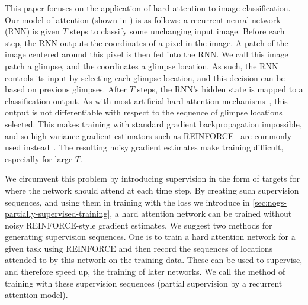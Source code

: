 This paper focuses on the application of hard attention to image classification.
Our model of attention (shown in ) is as
follows: a recurrent neural network (RNN) is given $T$ steps to classify some
unchanging input image. Before each step, the RNN outputs the coordinates of a
pixel in the image. A patch of the image centered around this pixel is then fed
into the RNN. We call this image patch a glimpse, and the coordinates a glimpse
location. As such, the RNN controls its input by selecting each glimpse
location, and this decision can be based on previous glimpses. After $T$ steps,
the RNN's hidden state is mapped to a classification output. As with most
artificial hard attention mechanisms~\cite{mnih2014recurrent,ba2014multiple},
this output is not differentiable with respect to the sequence of glimpse
locations selected. This makes training with standard gradient backpropagation
impossible, and so high variance gradient estimators such as
REINFORCE~\cite{williams1992simple} are commonly used
instead~\cite{mnih2014recurrent,ba2014multiple}. The resulting noisy gradient
estimates make training difficult, especially for large $T$.

We circumvent this problem by introducing supervision in the form of targets for
where the network should attend at each time step. By creating such supervision
sequences, and using them in training with the loss we introduce in
\cref{sec:nogs-partially-supervised-training}, a hard attention network can be
trained without noisy REINFORCE-style gradient estimates. We suggest two methods
for generating supervision sequences. One is to train a hard attention network
for a given task using REINFORCE and then record the sequences of locations
attended to by this network on the training data. These can be used to
supervise, and therefore speed up, the training of later networks. We call the
method of training with these supervision sequences \PSRAM{} (partial
supervision by a recurrent attention model).

